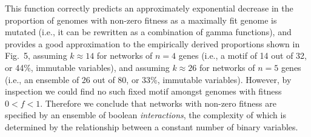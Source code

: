 \documentclass[10pt,letterpaper]{article}
\begin{document}
This function correctly predicts an approximately exponential decrease in the proportion of genomes with non-zero fitness as a maximally fit genome is mutated (i.e., it can be rewritten as a combination of gamma functions), and provides a good approximation to the empirically derived proportions shown in Fig.~5, assuming $k\approx 14$ for networks of $n=4$ genes (i.e., a motif of 14 out of 32, or 44\%, immutable variables), and assuming $k\approx 26$ for networks of $n=5$ genes (i.e., an ensemble of 26 out of 80, or 33\%, immutable variables). However, by inspection we could find no such fixed motif amongst genomes with fitness $0<f<1$. Therefore we conclude that networks with non-zero fitness are specified by an ensemble of boolean \emph{interactions}, the complexity of which is determined by the relationship between a constant number of binary variables.





\end{document}
